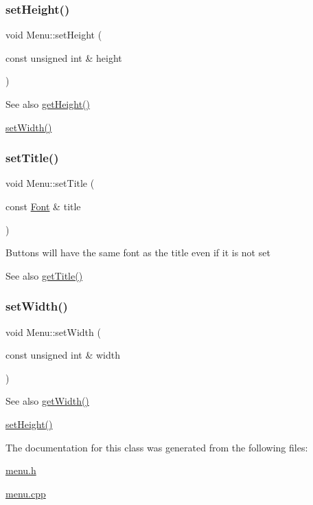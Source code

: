 \subsubsection{\texorpdfstring{set\+Height()}{setHeight()}}
{\footnotesize\ttfamily void Menu\+::set\+Height (\begin{DoxyParamCaption}\item[{const unsigned int \&}]{height }\end{DoxyParamCaption})}

\begin{DoxySeeAlso}{See also}
\mbox{\hyperlink{class_menu_a67f414acad54c237dc321a28b6ca723a}{get\+Height()}} 

\mbox{\hyperlink{class_menu_af6f5271f0f4546168c00467734ab7cd1}{set\+Width()}} 
\end{DoxySeeAlso}
\mbox{\label{class_menu_a5ec641fded3a140c8a5522ad689a301c}} 
\subsubsection{\texorpdfstring{set\+Title()}{setTitle()}}
{\footnotesize\ttfamily void Menu\+::set\+Title (\begin{DoxyParamCaption}\item[{const \mbox{\hyperlink{class_font}{Font}} \&}]{title }\end{DoxyParamCaption})}

Buttons will have the same font as the title even if it is not set \begin{DoxySeeAlso}{See also}
\mbox{\hyperlink{class_menu_a5e5ab9761f37464740171acef5f53ad6}{get\+Title()}} 
\end{DoxySeeAlso}
\mbox{\label{class_menu_af6f5271f0f4546168c00467734ab7cd1}} 
\subsubsection{\texorpdfstring{set\+Width()}{setWidth()}}
{\footnotesize\ttfamily void Menu\+::set\+Width (\begin{DoxyParamCaption}\item[{const unsigned int \&}]{width }\end{DoxyParamCaption})}

\begin{DoxySeeAlso}{See also}
\mbox{\hyperlink{class_menu_a993d925b955146c9e265d16df1371f51}{get\+Width()}} 

\mbox{\hyperlink{class_menu_a54f1e7a7bb1cd809477f8e8b2e578366}{set\+Height()}} 
\end{DoxySeeAlso}


The documentation for this class was generated from the following files\+:\begin{DoxyCompactItemize}
\item 
\mbox{\hyperlink{menu_8h}{menu.\+h}}\item 
\mbox{\hyperlink{menu_8cpp}{menu.\+cpp}}\end{DoxyCompactItemize}
